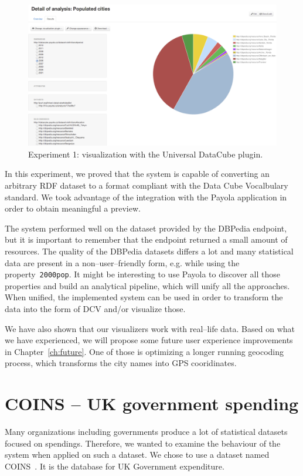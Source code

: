 \begin{figure}
  \centering
  \includegraphics[width=140mm]{img/payola-exp-01-vis2.png}
  \caption{Experiment 1: visualization with the Universal DataCube plugin.}
  \label{fig:payola-exp-01-vis2}
\end{figure}

In this experiment, we proved that the system is capable of converting an 
arbitrary RDF dataset to a format compliant with the Data Cube Vocalbulary 
standard. We took advantage of the integration with the Payola application in 
order to obtain meaningful a preview.

The system performed well on the dataset provided by the DBPedia endpoint, but 
it is important to remember that the endpoint returned a small amount of 
resources. The quality of the DBPedia datasets differs a lot and many 
statistical data are present in a non--user--friendly form, e.g. while using the 
property~\texttt{2000pop}. It might be interesting to use Payola to discover 
all those properties and build an analytical pipeline, which will unify all the 
approaches. When unified, the implemented system can be used in order to 
transform the data into the form of DCV and/or visualize those.

We have also shown that our visualizers work with real--life data. Based on 
what we have experienced, we will propose some future user experience 
improvements in Chapter~\ref{ch:future}. One of those is optimizing a longer running 
geocoding process, which transforms the city names into GPS cooridinates.

\section{COINS -- UK government spending}
Many organizations including governments produce a lot of statistical datasets 
focused on spendings. Therefore, we wanted to examine the behaviour of the 
system when applied on such a dataset. We chose to use a dataset named 
COINS~\cite{coins}. It is the database for UK Government expenditure.

